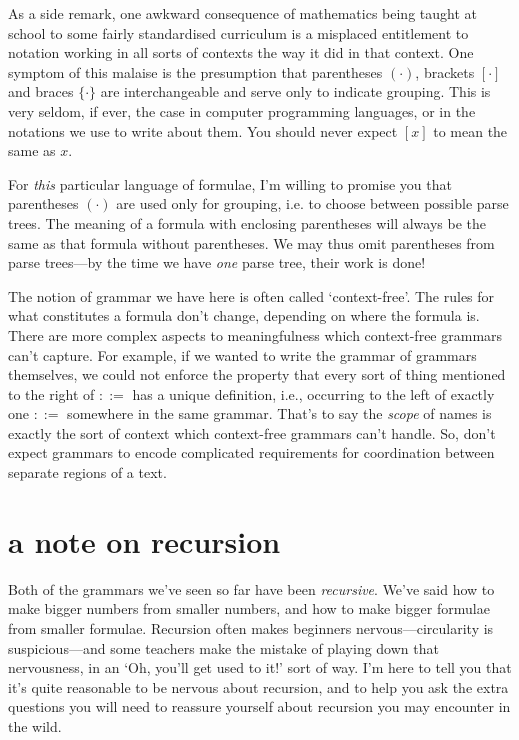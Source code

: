 \documentclass{book}
\begin{document}
As a side remark, one awkward consequence of mathematics being taught at school to some fairly standardised curriculum is a misplaced entitlement to notation working in all sorts of contexts the way it did in that context. One symptom of this malaise is the presumption that parentheses $(\cdot)$, brackets $[\cdot]$ and braces $\{\cdot\}$ are interchangeable and serve only to indicate grouping. This is very seldom, if ever, the case in computer programming languages, or in the notations we use to write about them. You should never expect $[x]$ to mean the same as $x$.

For \emph{this} particular language of formulae, I'm willing to promise you that parentheses $(\cdot)$ are used only for grouping, i.e. to choose between possible parse trees. The meaning of a formula with enclosing parentheses will always be the same as that formula without parentheses. We may thus omit parentheses from parse trees---by the time we have \emph{one} parse tree, their work is done!

The notion of grammar we have here is often called `context-free'. The rules for what constitutes a formula don't change, depending on where the formula is. There are more complex aspects to meaningfulness which context-free grammars can't capture. For example, if we wanted to write the grammar of grammars themselves, we could not enforce the property that every sort of thing mentioned to the right of $::=$ has a unique definition, i.e., occurring to the left of exactly one $::=$ somewhere in the same grammar. That's to say the \emph{scope} of names is exactly the sort of context which context-free grammars can't handle. So, don't expect grammars to encode complicated requirements for coordination between separate regions of a text.


\section{a note on recursion}

Both of the grammars we've seen so far have been \emph{recursive}. We've said how to make bigger numbers from smaller numbers, and how to make bigger formulae from smaller formulae. Recursion often makes beginners nervous---circularity is suspicious---and some teachers make the mistake of playing down that nervousness, in an `Oh, you'll get used to it!' sort of way. I'm here to tell you that it's quite reasonable to be nervous about recursion, and to help you ask the extra questions you will need to reassure yourself about recursion you may encounter in the wild.
\end{document}
